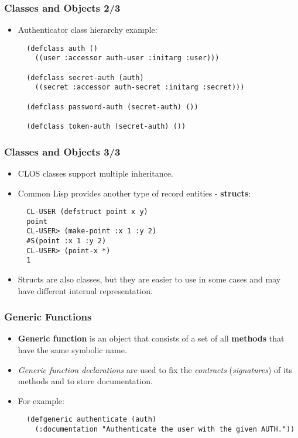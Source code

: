 \documentclass{beamer}
\begin{document}
\begin{frame}[fragile]
  \frametitle{Classes and Objects 2/3}
  \begin{itemize}
  \item Authenticator class hierarchy example:
\begin{verbatim}
  (defclass auth ()
    ((user :accessor auth-user :initarg :user)))

  (defclass secret-auth (auth)
    ((secret :accessor auth-secret :initarg :secret)))

  (defclass password-auth (secret-auth) ())

  (defclass token-auth (secret-auth) ())
\end{verbatim}
  \end{itemize}
\end{frame}

\begin{frame}[fragile]
  \frametitle{Classes and Objects 3/3}
  \begin{itemize}
  \item CLOS classes support multiple inheritance.
  \item Common Lisp provides another type of record entities - \textbf{structs}:
\begin{verbatim}
  CL-USER (defstruct point x y)
  point
  CL-USER> (make-point :x 1 :y 2)
  #S(point :x 1 :y 2)
  CL-USER> (point-x *)
  1
\end{verbatim}
  \item Structs are also classes, but they are easier to use in some cases and
    may have different internal representation.
  \end{itemize}
\end{frame}

\begin{frame}[fragile]
  \frametitle{Generic Functions}
  \begin{itemize}
  \item \textbf{Generic function} is an object that consists of a set of all
    \textbf{methods} that have the same symbolic name.
  \item \textit{Generic function declarations} are used to fix the
    \textit{contracts} (\textit{signatures}) of its methods and to store
    documentation.
  \item For example:
\begin{verbatim}
  (defgeneric authenticate (auth)
    (:documentation "Authenticate the user with the given AUTH."))
\end{verbatim}
  \end{itemize}
\end{frame}
\end{document}
